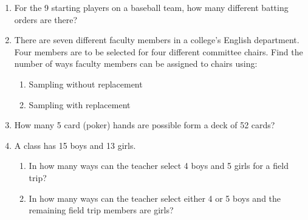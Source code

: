 \documentclass{article}
\begin{document}
\begin{enumerate}
    \item For the 9 starting players on a baseball team, how many different batting orders are there?\vspace{30pt}%
    
    \item There are seven different faculty members in a college's English department. Four members are to be selected for four different committee chairs. Find the number of ways faculty members can be assigned to chairs using:%
    \begin{enumerate}
        \item Sampling without replacement\vspace{30pt}
        \item Sampling with replacement\vspace{30pt}
    \end{enumerate}
    
    \item How many 5 card (poker) hands are possible form a deck of 52 cards?\vspace{30pt}%
    
    \item A class has 15 boys and 13 girls.%
    \begin{enumerate}
        \item In how many ways can the teacher select 4 boys and 5 girls for a field trip?\vspace{30pt}
        \item In how many ways can the teacher select either 4 or 5 boys and the remaining  field trip members are girls?\vspace{30pt}%
    \end{enumerate}
    
    

\end{enumerate}
\end{document}
